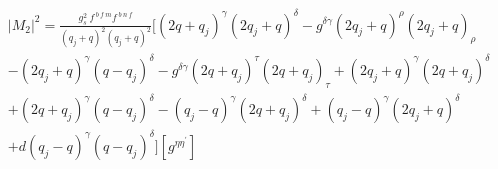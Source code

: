 %


\begin{equation}
\begin{split}
&|M_2|^2=\frac{g_s^2\: f^{\:b\:f\:m} f^{\:b\:n\:f}}{(q_j +q)^2 (q_j +q)^2}[(2q+q_j)^{{\gamma}}(2q_j+q)^{\delta}
-g^{{\delta}{\gamma}}(2q_j+q)^{\rho}(2q_j +q)_{{\rho}}\\&-(2q_j+q)^{\gamma}(q-q_j)^{{\delta}}-g^{{\delta}{\gamma}}(2q +q_j)^{\tau}(2q+q_j)_{{\tau}}+(2q_j +q)^{{\gamma}}(2q +q_j)^{\delta}\\
&+(2q +q_j)^{\gamma}(q-q_j)^{{\delta}}-(q_j -q)^{\gamma}(2q+q_j)^{{\delta}}+(q_j -q)^{\gamma}(2q_j +q)^{{\delta}}\\
&+d(q_j -q)^{\gamma}(q-q_j)^{{\delta}}][g^{{\eta}{{\eta}^{\prime}}}]
\end{split}
\end{equation}


